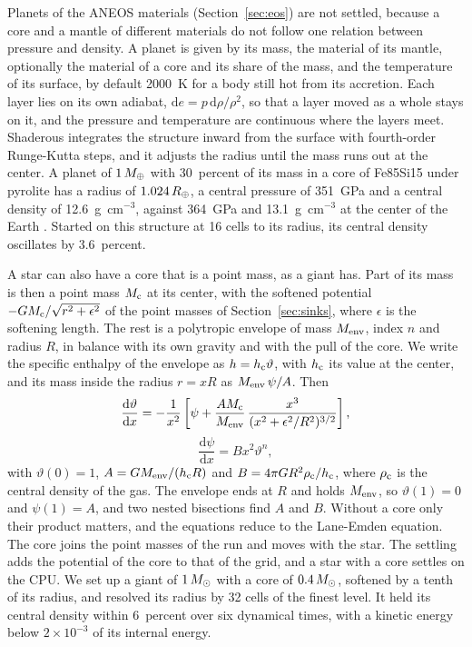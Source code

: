 \documentclass[twocolumn]{aastex701}
\begin{document}
Planets of the ANEOS materials (Section~\ref{sec:eos}) are not settled, because a core and a mantle of different materials do not follow one relation between pressure and density. A planet is given by its mass, the material of its mantle, optionally the material of a core and its share of the mass, and the temperature of its surface, by default 2000~K for a body still hot from its accretion. Each layer lies on its own adiabat, $\mathrm{d}e = p\,\mathrm{d}\rho/\rho^2$, so that a layer moved as a whole stays on it, and the pressure and temperature are continuous where the layers meet. Shaderous integrates the structure inward from the surface with fourth-order Runge-Kutta steps, and it adjusts the radius until the mass runs out at the center. A planet of $1\,M_\oplus$ with 30~percent of its mass in a core of Fe85Si15 under pyrolite has a radius of $1.024\,R_\oplus$, a central pressure of 351~GPa and a central density of 12.6~g~cm$^{-3}$, against 364~GPa and 13.1~g~cm$^{-3}$ at the center of the Earth \citep{Dziewonski1981}. Started on this structure at 16 cells to its radius, its central density oscillates by 3.6~percent.

A star can also have a core that is a point mass, as a giant has. Part of its mass is then a point mass $M_{\rm c}$ at its center, with the softened potential $-GM_{\rm c}/\sqrt{r^2 + \epsilon^2}$ of the point masses of Section~\ref{sec:sinks}, where $\epsilon$ is the softening length. The rest is a polytropic envelope of mass $M_{\rm env}$, index $n$ and radius $R$, in balance with its own gravity and with the pull of the core. We write the specific enthalpy of the envelope as $h = h_{\rm c}\vartheta$, with $h_{\rm c}$ its value at the center, and its mass inside the radius $r = xR$ as $M_{\rm env}\,\psi/A$. Then
\begin{equation*}
\frac{\mathrm{d}\vartheta}{\mathrm{d}x} = -\frac{1}{x^2}\left[\psi + \frac{A M_{\rm c}}{M_{\rm env}}\,\frac{x^3}{(x^2 + \epsilon^2/R^2)^{3/2}}\right],
\end{equation*}
\begin{equation*}
\frac{\mathrm{d}\psi}{\mathrm{d}x} = B x^2\vartheta^n,
\end{equation*}
with $\vartheta(0) = 1$, $A = GM_{\rm env}/(h_{\rm c}R)$ and $B = 4\pi G R^2\rho_{\rm c}/h_{\rm c}$, where $\rho_{\rm c}$ is the central density of the gas. The envelope ends at $R$ and holds $M_{\rm env}$, so $\vartheta(1) = 0$ and $\psi(1) = A$, and two nested bisections find $A$ and $B$. Without a core only their product matters, and the equations reduce to the Lane-Emden equation. The core joins the point masses of the run and moves with the star. The settling adds the potential of the core to that of the grid, and a star with a core settles on the CPU. We set up a giant of $1\,M_\odot$ with a core of $0.4\,M_\odot$, softened by a tenth of its radius, and resolved its radius by 32 cells of the finest level. It held its central density within 6~percent over six dynamical times, with a kinetic energy below $2\times10^{-3}$ of its internal energy.
\end{document}
